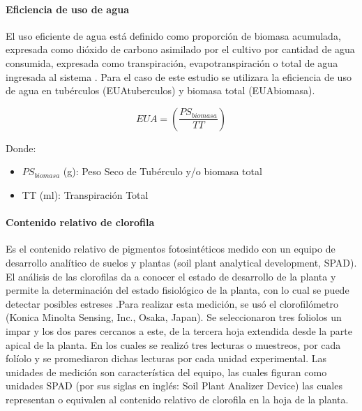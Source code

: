 \documentclass[fleqn,10pt]{Flavio}\usepackage[]{graphicx}\usepackage[]{color}
\begin{document}
\paragraph{Eficiencia de uso de agua} El uso eficiente de agua est\'a definido como proporci\'on de biomasa acumulada, expresada como di\'oxido de carbono asimilado por el cultivo por cantidad de agua consumida, expresada como transpiraci\'on, evapotranspiraci\'on o total de agua ingresada al sistema \citep{Sinclair1984}. Para el caso de este estudio se utilizara la eficiencia de uso de agua en tub\'erculos (EUAtuberculos) y biomasa total (EUAbiomasa).

$$ EUA = \left(\frac{PS_{biomasa}}{TT}\right) $$

Donde:

\begin{itemize}[noitemsep]
\item $PS_{biomasa}$ (g): Peso Seco de Tub\'erculo y/o biomasa total 
\item TT (ml): Transpiraci\'on Total
\end{itemize}

\paragraph{Contenido relativo de clorofila} Es el contenido relativo de pigmentos fotosint\'eticos medido con un equipo de desarrollo anal\'itico de suelos y plantas (soil plant analytical development, SPAD). El an\'alisis de las clorofilas da a conocer el estado de desarrollo de la planta y permite la determinaci\'on del estado fisiol\'ogico de la planta, con lo cual se puede detectar posibles estreses \citep{Ferri2004}.Para realizar esta medici\'on, se us\'o el clorofil\'ometro (Konica Minolta Sensing, Inc., Osaka, Japan). Se seleccionaron tres  foliolos un impar y los dos pares cercanos a este, de la tercera hoja extendida desde la parte apical de la planta. En los cuales se realiz\'o tres lecturas o muestreos, por cada fol\'iolo y se promediaron  dichas lecturas por cada unidad experimental. Las unidades de medici\'on son caracter\'istica del equipo, las cuales figuran como unidades SPAD (por sus siglas en ingl\'es: Soil Plant Analizer Device) las cuales representan o equivalen al contenido relativo de clorofila en la hoja de la planta.
\end{document}
